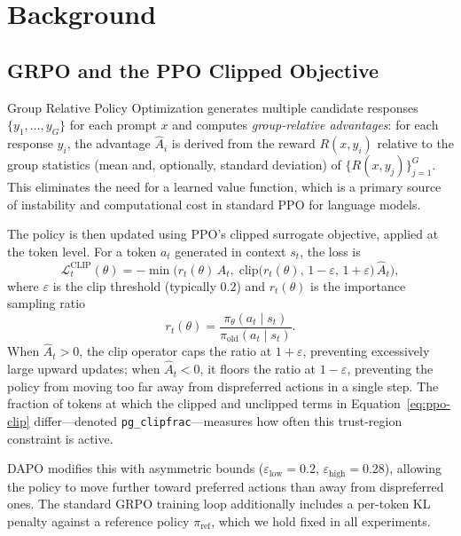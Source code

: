 \section{Background}
\label{sec:background}

\subsection{GRPO and the PPO Clipped Objective}
\label{sec:bg-grpo}

Group Relative Policy Optimization \citep{deepseekr1} generates multiple candidate responses $\{y_1, \dots, y_G\}$ for each prompt $x$ and computes \emph{group-relative advantages}: for each response $y_i$, the advantage $\hat{A}_i$ is derived from the reward $R(x, y_i)$ relative to the group statistics (mean and, optionally, standard deviation) of $\{R(x, y_j)\}_{j=1}^G$.
This eliminates the need for a learned value function, which is a primary source of instability and computational cost in standard PPO for language models.

The policy is then updated using PPO's clipped surrogate objective, applied at the token level.
For a token $a_t$ generated in context $s_t$, the loss is
\begin{equation}
\label{eq:ppo-clip}
\mathcal{L}^{\text{CLIP}}_t(\theta) = -\min\!\Big( r_t(\theta)\,\hat{A}_t,\; \text{clip}\big(r_t(\theta),\, 1{-}\varepsilon,\, 1{+}\varepsilon\big)\,\hat{A}_t \Big),
\end{equation}
where $\varepsilon$ is the clip threshold (typically $0.2$) and $r_t(\theta)$ is the importance sampling ratio
\begin{equation}
\label{eq:is-ratio}
r_t(\theta) = \frac{\pi_\theta(a_t \mid s_t)}{\pi_{\text{old}}(a_t \mid s_t)}.
\end{equation}
When $\hat{A}_t > 0$, the clip operator caps the ratio at $1 + \varepsilon$, preventing excessively large upward updates; when $\hat{A}_t < 0$, it floors the ratio at $1 - \varepsilon$, preventing the policy from moving too far away from dispreferred actions in a single step.
The fraction of tokens at which the clipped and unclipped terms in Equation~\ref{eq:ppo-clip} differ---denoted \texttt{pg\_clipfrac}---measures how often this trust-region constraint is active.

DAPO \citep{dapo2025} modifies this with asymmetric bounds ($\varepsilon_{\text{low}} = 0.2$, $\varepsilon_{\text{high}} = 0.28$), allowing the policy to move further toward preferred actions than away from dispreferred ones.
The standard GRPO training loop additionally includes a per-token KL penalty against a reference policy $\pi_{\text{ref}}$, which we hold fixed in all experiments.


